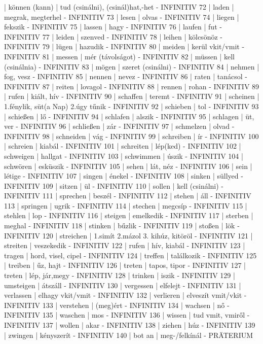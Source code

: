 \documentclass{article}
\newenvironment{exmp}{\verbatim}{\endverbatim}
\begin{document}
\begin{exmp}
71 | können (kann) | tud (csinálni), (csinál)hat,-het - INFINITIV
72 | laden | megrak, megterhel  - INFINITIV
73 | lesen | olvas - INFINITIV
74 | liegen | fekszik - INFINITIV
75 | lassen | hagy - INFINITIV
76 | laufen | fut - INFINITIV
77 | leiden | szenved - INFINITIV
78 | leihen | kölcsönöz - INFINITIV
79 | lügen | hazudik - INFINITIV
80 | meiden  | kerül vkit/vmit - INFINITIV
81 | messen | mér (távolságot) - INFINITIV
82 | müssen | kell (csinálnia) - INFINITIV
83 | mögen | szeret (csinálni) - INFINITIV
84 | nehmen | fog, vesz - INFINITIV
85 | nennen | nevez - INFINITIV
86 | raten | tanácsol - INFINITIV
87 | reiten | lovagol - INFINITIV
88 | rennen | rohan - INFINITIV
89 | rufen | kiált, hív - INFINITIV
90 | schaffen | teremt - INFINITIV
91 | scheinen | 1.fénylik, süt(a Nap) 2.úgy tűnik - INFINITIV
92 | schieben | tol - INFINITIV
93 | schießen | lő - INFINITIV
94 | schlafen | alszik - INFINITIV
95 | schlagen | üt, ver - INFINITIV
96 | schließen | zár - INFINITIV
97 | schmelzen | olvad - INFINITIV
98 | schneiden | vág - INFINITIV
99 | schreiben | ír - INFINITIV
100 | schreien | kiabál - INFINITIV
101 | schreiten | lép(ked) - INFINITIV
102 | schweigen | hallgat - INFINITIV
103 | schwimmen | úszik - INFINITIV
104 | schwören | esküszik - INFINITIV
105 | sehen | lát, néz - INFINITIV
106 | sein | létige - INFINITIV
107 | singen | énekel - INFINITIV
108 | sinken | süllyed - INFINITIV
109 | sitzen | ül - INFINITIV
110 | sollen | kell (csinálni) - INFINITIV
111 | sprechen | beszél - INFINITIV
112 | stehen | áll - INFINITIV
113 | springen | ugrik - INFINITIV
114 | stechen | megcsíp - INFINITIV
115 | stehlen | lop - INFINITIV
116 | steigen | emelkedik - INFINITIV
117 | sterben | meghal - INFINITIV
118 | stinken | bűzlik - INFINITIV
119 | stoßen | lök - INFINITIV
120 | streichen | 1.simít 2.mázol 3. kihúz, kitöröl - INFINITIV
121 | streiten | veszekedik - INFINITIV
122 | rufen | hív, kiabál - INFINITIV
123 | tragen | hord, visel, cipel - INFINITIV
124 | treffen | találkozik - INFINITIV
125 | treiben | űz, hajt - INFINITIV
126 | treten | tapos, tipor - INFINITIV
127 | treten | lép, jár,megy - INFINITIV
128 | trinken | iszik - INFINITIV
129 | umsteigen | átszáll - INFINITIV
130 | vergessen | elfelejt - INFINITIV
131 | verlassen | elhagy vkit/vmit - INFINITIV
132 | verlieren | elveszít vmit/vkit - INFINITIV
133 | verstehen | (meg)ért - INFINITIV
134 | wachsen | nő - INFINITIV
135 | waschen | mos - INFINITIV
136 | wissen | tud vmit, vmiről - INFINITIV
137 | wollen | akar - INFINITIV
138 | ziehen | húz - INFINITIV
139 | zwingen | kényszerít - INFINITIV
140 | bot an | meg-/felkínál - PRÄTERIUM

\end{exmp}
\end{document}
